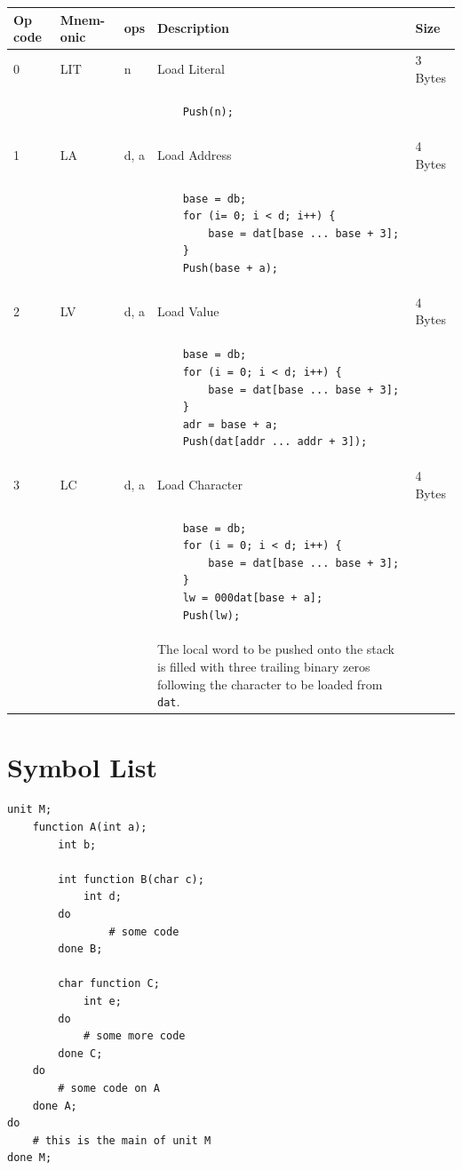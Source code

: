 \documentclass[11pt]{report}
\begin{document}
\begin{tabular}{p{2em}|p{2em}|l|p{7cm}|l}
	Op code & Mnem-onic & ops & Description & Size \\ \hline
	0 & LIT & n & Load Literal & 3 Bytes \\
	&&&
	\begin{lstlisting}
	Push(n);
	\end{lstlisting}\\ \hline
	
	1 & LA & d, a & Load Address & 4 Bytes\\
	&&&
	\begin{lstlisting}
	base = db;
	for (i= 0; i < d; i++) {
		base = dat[base ... base + 3];
	}
	Push(base + a);
	\end{lstlisting} \\ \hline
	
	2 & LV & d, a & Load Value & 4 Bytes \\
	&&&
	\begin{lstlisting}
	base = db;
	for (i = 0; i < d; i++) {
		base = dat[base ... base + 3];
	}
	adr = base + a;
	Push(dat[addr ... addr + 3]);
	\end{lstlisting} \\ \hline
	
	3 & LC & d, a & Load Character & 4 Bytes \\
	&&&
	\begin{lstlisting}
	base = db;
	for (i = 0; i < d; i++) {
		base = dat[base ... base + 3];
	}
	lw = 000dat[base + a];
	Push(lw);
	\end{lstlisting} \\
	&&& The local word to be pushed onto the stack is filled with three trailing binary zeros following the character to be loaded from {\tt dat}. \\ \hline
\end{tabular}

\chapter{Symbol List}

\lstset{language=NoBeard,
	numbers=left,
	tabsize=2
}
\begin{lstlisting}
unit M;
	function A(int a);
		int b;
		
		int function B(char c);
			int d;
		do
				# some code
		done B;
		
		char function C;
			int e;
		do
			# some more code
		done C;
	do
		# some code on A
	done A;
do
	# this is the main of unit M
done M;
\end{lstlisting}
\end{document}
